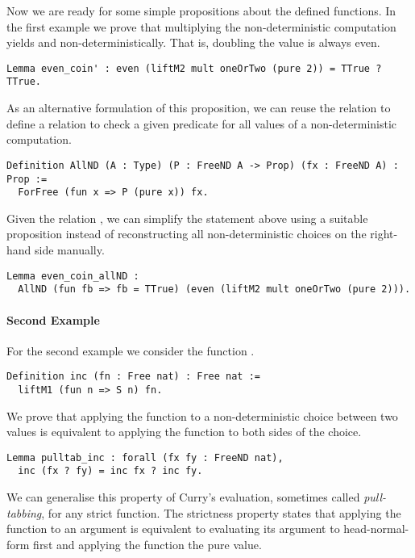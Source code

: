 Now we are ready for some simple propositions about the defined
functions.
In the first example we prove that multiplying the non-deterministic
computation  yields  and 
non-deterministically.
That is, doubling the value  is always even.

\begin{verbatim}
Lemma even_coin' : even (liftM2 mult oneOrTwo (pure 2)) = TTrue ? TTrue.
\end{verbatim}

As an alternative formulation of this proposition, we can reuse the
relation  to define a relation  to check a
given predicate for all values of a non-deterministic computation.

\begin{verbatim}
Definition AllND (A : Type) (P : FreeND A -> Prop) (fx : FreeND A) : Prop :=
  ForFree (fun x => P (pure x)) fx.
\end{verbatim}

Given the relation , we can simplify the statement above
using a suitable proposition instead of reconstructing all
non-deterministic choices on the right-hand side manually.

\begin{verbatim}
Lemma even_coin_allND :
  AllND (fun fb => fb = TTrue) (even (liftM2 mult oneOrTwo (pure 2))).
\end{verbatim}

\paragraph{Second Example}
For the second example we consider the function .

\begin{verbatim}
Definition inc (fn : Free nat) : Free nat :=
  liftM1 (fun n => S n) fn.
\end{verbatim}

We prove that applying the function  to a non-deterministic
choice between two values is equivalent to applying the function to
both sides of the choice.

\begin{verbatim}
Lemma pulltab_inc : forall (fx fy : FreeND nat),
  inc (fx ? fy) = inc fx ? inc fy.
\end{verbatim}

We can generalise this property of Curry's evaluation, sometimes
called \emph{pull-tabbing}, for any strict function.
The strictness property states that applying the function to an
argument is equivalent to evaluating its argument to head-normal-form
first and applying the function the pure value.

